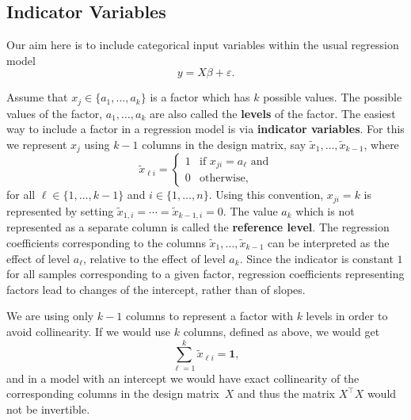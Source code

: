 \documentclass[
  a4paper,
]{article}
\theoremstyle{definition}
\theoremstyle{definition}
\theoremstyle{definition}
\theoremstyle{definition}
\theoremstyle{remark}
\begin{document}
\subsection{Indicator Variables}\label{indicator-variables}

Our aim here is to include categorical input variables within the
usual regression model
\begin{equation*}
  y
  = X\beta + \varepsilon.
\end{equation*}

Assume that \(x_j \in \{a_1, \ldots, a_k\}\) is a factor which has \(k\) possible
values. The possible values of the factor, \(a_1, \ldots, a_k\) are also called
the \textbf{levels} of the factor. The easiest way to include a factor in a
regression model is via \textbf{indicator variables}. For this we represent \(x_j\)
using \(k-1\) columns in the design matrix, say \(\tilde x_1, \ldots, \tilde
x_{k-1}\), where
\begin{equation*}
  \tilde x_{\ell i}
  = \begin{cases}
    1 & \mbox{if $x_{ji} = a_\ell$ and} \\
    0 & \mbox{otherwise,}
  \end{cases}
\end{equation*}
for all \(\ell \in \{1, \ldots, k-1\}\) and \(i \in \{1, \ldots, n\}\).
Using this convention, \(x_{ji} = k\) is represented by setting
\(\tilde x_{1,i} = \cdots = \tilde x_{k-1,i} = 0\). The value \(a_k\)
which is not represented as a separate column is called the
\textbf{reference level}. The regression coefficients corresponding to the
columns \(\tilde x_1, \ldots, \tilde x_{k-1}\) can be interpreted
as the effect of level \(a_\ell\), relative to the effect
of level \(a_k\). Since the indicator is constant \(1\) for all samples
corresponding to a given factor, regression coefficients representing factors
lead to changes of the intercept, rather than of slopes.

We are using only \(k-1\) columns to represent a factor
with \(k\) levels in order to avoid collinearity. If we would use \(k\) columns,
defined as above, we would get
\begin{equation*}
  \sum_{\ell=1}^k \tilde x_{\ell i}
  = \mathbf{1},
\end{equation*}
and in a model with an intercept we would have exact collinearity of
the corresponding columns in the design matrix~\(X\) and thus
the matrix \(X^\top X\) would not be invertible.
\end{document}
